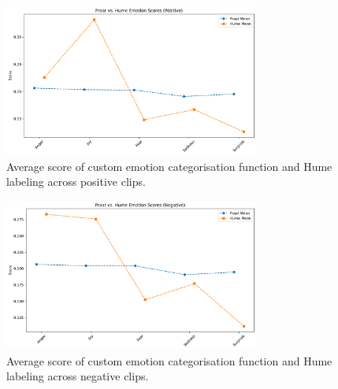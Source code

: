 \begin{figure}[H]
    \centering
    \includegraphics[width=0.75\textwidth]{png/results/rq1_new/praat_hume_positive_scatter.pdf}
    \caption{Average score of custom emotion categorisation function and Hume labeling across positive clips.}
    \label{fig:rq1_scatter_hume_praat_pos}
\end{figure}


\begin{figure}[H]
    \centering
    \includegraphics[width=0.75\textwidth]{png/results/rq1_new/praat_hume_negative_scatter.pdf}
    \caption{Average score of custom emotion categorisation function and Hume labeling across negative clips.}
    \label{fig:rq1_scatter_hume_praat_neg}
\end{figure}

